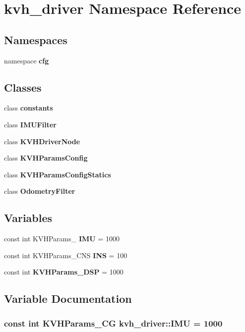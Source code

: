 \section{kvh\-\_\-driver \-Namespace \-Reference}
\label{namespacekvh__driver}
\subsection*{\-Namespaces}
\begin{DoxyCompactItemize}
\item 
namespace {\bf cfg}
\end{DoxyCompactItemize}
\subsection*{\-Classes}
\begin{DoxyCompactItemize}
\item 
class {\bf constants}
\item 
class {\bf \-I\-M\-U\-Filter}
\item 
class {\bf \-K\-V\-H\-Driver\-Node}
\item 
class {\bf \-K\-V\-H\-Params\-Config}
\item 
class {\bf \-K\-V\-H\-Params\-Config\-Statics}
\item 
class {\bf \-Odometry\-Filter}
\end{DoxyCompactItemize}
\subsection*{\-Variables}
\begin{DoxyCompactItemize}
\item 
const int \-K\-V\-H\-Params\-\_ {\bf \-I\-M\-U} = 1000
\item 
const int \-K\-V\-H\-Params\-\_\-\-C\-N\-S {\bf \-I\-N\-S} = 100
\item 
const int {\bf \-K\-V\-H\-Params\-\_\-\-D\-S\-P} = 1000
\end{DoxyCompactItemize}


\subsection{\-Variable \-Documentation}
\subsubsection[{\-I\-M\-U}]{\setlength{\rightskip}{0pt plus 5cm}const int \-K\-V\-H\-Params\-\_\-\-C\-G {\bf kvh\-\_\-driver\-::\-I\-M\-U} = 1000}\label{namespacekvh__driver_a0fd5a58a43bdfb53060a96905f42b535}


